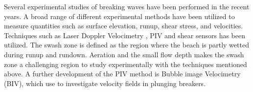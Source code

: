 \documentclass[a4paper, 11pt, english, twoside, openright]{article}
\begin{document}






 Several experimental studies of breaking waves have been performed in the recent years. A broad range of different experimental methods have been utilized to measure quantities such as surface elevation, runup, shear stress, and velocities. Techniques such as Laser Doppler Velocimetry \citep{petti01}, PIV \citep{cowen03} and shear sensors \citep{Barnes09}  has been utilized. The swash zone is defined as the region where the beach is partly wetted during runup and rundown. Aeration and the 
small flow depth makes the swash zone a challenging region to study experimentally with the techniques mentioned above. A further development of the PIV method is Bubble image Velocimetry (BIV), which \cite{rivillas2012estimation} use to investigate velocity fields in plunging breakers.
 
 
 
 

 
 

\end{document}
